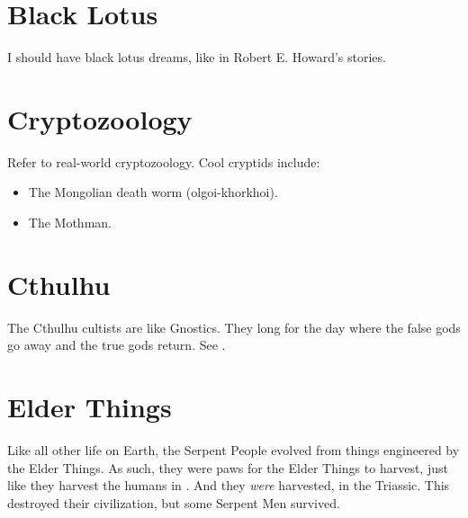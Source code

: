 \documentclass[a4paper,12pt,openany,oneside]{book}
\begin{document}
\section{Black Lotus}
I should have black lotus dreams, like in Robert E. Howard's stories.















\section{Cryptozoology}
Refer to real-world cryptozoology. 
Cool cryptids include: 

\begin{itemize}
  \item The Mongolian death worm (olgoi-khorkhoi).
  \item The Mothman.
\end{itemize}
















\section{Cthulhu}
The Cthulhu cultists are like Gnostics. 
They long for the day where the false gods go away and the true gods return. 
See \cite{RobertMPrice:TheOldOnesPromiseofEternalLife}.















\section{Elder Things}
Like all other life on Earth, the Serpent People evolved from things engineered by the Elder Things. 
As such, they were paws for the Elder Things to harvest, just like they harvest the humans in \cite{TimCurran:Hive}. 
And they \emph{were} harvested, in the Triassic. 
This destroyed their civilization, but some Serpent Men survived. 
\end{document}
